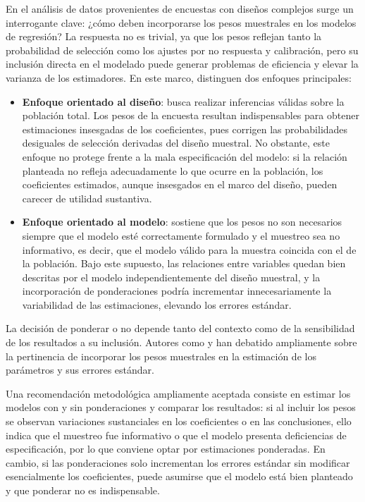 \documentclass[
  spanish,
  12pt,
]{book}
\begin{document}
En el análisis de datos provenientes de encuestas con diseños complejos surge un interrogante clave: ¿cómo deben incorporarse los pesos muestrales en los modelos de regresión? La respuesta no es trivial, ya que los pesos reflejan tanto la probabilidad de selección como los ajustes por no respuesta y calibración, pero su inclusión directa en el modelado puede generar problemas de eficiencia y elevar la varianza de los estimadores. En este marco, \citet{heeringa2017applied} distinguen dos enfoques principales:

\begin{itemize}
\item
  \textbf{Enfoque orientado al diseño}: busca realizar inferencias válidas sobre la población total. Los pesos de la encuesta resultan indispensables para obtener estimaciones insesgadas de los coeficientes, pues corrigen las probabilidades desiguales de selección derivadas del diseño muestral. No obstante, este enfoque no protege frente a la mala especificación del modelo: si la relación planteada no refleja adecuadamente lo que ocurre en la población, los coeficientes estimados, aunque insesgados en el marco del diseño, pueden carecer de utilidad sustantiva.
\item
  \textbf{Enfoque orientado al modelo}: sostiene que los pesos no son necesarios siempre que el modelo esté correctamente formulado y el muestreo sea no informativo, es decir, que el modelo válido para la muestra coincida con el de la población. Bajo este supuesto, las relaciones entre variables quedan bien descritas por el modelo independientemente del diseño muestral, y la incorporación de ponderaciones podría incrementar innecesariamente la variabilidad de las estimaciones, elevando los errores estándar.
\end{itemize}

La decisión de ponderar o no depende tanto del contexto como de la sensibilidad de los resultados a su inclusión. Autores como \citet{skinner1989analysis} y \citet{pfeffermann2011modelling} han debatido ampliamente sobre la pertinencia de incorporar los pesos muestrales en la estimación de los parámetros y sus errores estándar.

Una recomendación metodológica ampliamente aceptada consiste en estimar los modelos con y sin ponderaciones y comparar los resultados: si al incluir los pesos se observan variaciones sustanciales en los coeficientes o en las conclusiones, ello indica que el muestreo fue informativo o que el modelo presenta deficiencias de especificación, por lo que conviene optar por estimaciones ponderadas. En cambio, si las ponderaciones solo incrementan los errores estándar sin modificar esencialmente los coeficientes, puede asumirse que el modelo está bien planteado y que ponderar no es indispensable.
\end{document}
